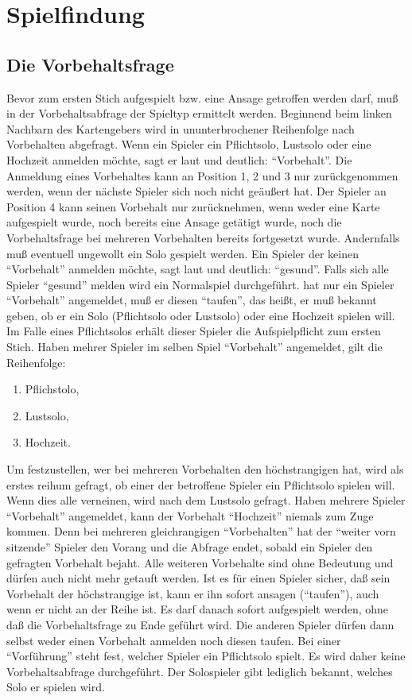 \documentclass[12pt]{scrartcl}
\begin{document}
\section{Spielfindung}

\subsection{Die Vorbehaltsfrage}
Bevor zum ersten Stich aufgespielt bzw. eine Ansage getroffen
werden darf, muß in der Vorbehaltsabfrage der Spieltyp ermittelt
werden. Beginnend beim linken Nachbarn des Kartengebers wird in
ununterbrochener Reihenfolge nach Vorbehalten abgefragt. Wenn ein
Spieler ein Pflichtsolo, Lustsolo oder eine Hochzeit anmelden
möchte, sagt er laut und deutlich: "`Vorbehalt"'. Die Anmeldung
eines Vorbehaltes kann an Position 1, 2 und 3 nur zurückgenommen
werden, wenn der nächste Spieler sich noch nicht geäußert hat.
Der Spieler an Position 4 kann seinen Vorbehalt nur zurücknehmen,
wenn weder eine Karte aufgespielt wurde, noch bereits eine Ansage
getätigt wurde, noch die Vorbehaltsfrage bei mehreren
Vorbehalten bereits fortgesetzt wurde. Andernfalls muß eventuell
ungewollt ein Solo gespielt werden. Ein Spieler der keinen
"`Vorbehalt"' anmelden möchte, sagt laut und deutlich:
"`gesund"'. Falls sich alle Spieler "`gesund"' melden wird ein
Normalspiel durchgeführt. hat nur ein Spieler "`Vorbehalt"'
angemeldet, muß er diesen "`taufen"', das heißt, er muß bekannt
geben, ob er ein Solo (Pflichtsolo oder Lustsolo) oder eine
Hochzeit spielen will. Im Falle eines Pflichtsolos erhält dieser
Spieler die Aufspielpflicht zum ersten Stich. Haben mehrer Spieler
im selben Spiel "`Vorbehalt"' angemeldet, gilt die Reihenfolge:
\begin{enumerate}
  \item Pflichstolo,
  \item Lustsolo,
  \item Hochzeit.
\end{enumerate}
Um festzustellen, wer bei mehreren Vorbehalten den
höchstrangigen hat, wird als erstes reihum gefragt, ob einer der
betroffene Spieler ein Pflichtsolo spielen will. Wenn dies alle
verneinen, wird nach dem Lustsolo gefragt. Haben mehrere Spieler
"`Vorbehalt"' angemeldet, kann der Vorbehalt "`Hochzeit"' niemals
zum Zuge kommen. Denn bei mehreren gleichrangigen "`Vorbehalten"'
hat der "`weiter vorn sitzende"' Spieler den Vorang und die
Abfrage endet, sobald ein Spieler den gefragten Vorbehalt bejaht.
Alle weiteren Vorbehalte sind ohne Bedeutung und dürfen auch
nicht mehr getauft werden. Ist es für einen Spieler sicher, daß
sein Vorbehalt der höchstrangige ist, kann er ihn sofort ansagen
("`taufen"'), auch wenn er nicht an der Reihe ist. Es darf danach
sofort aufgespielt werden, ohne daß die Vorbehaltsfrage zu Ende
geführt wird. Die anderen Spieler dürfen dann selbst weder
einen Vorbehalt anmelden noch diesen taufen. Bei einer
"`Vorführung"' steht fest, welcher Spieler ein Pflichtsolo
spielt. Es wird daher keine Vorbehaltsabfrage durchgeführt. Der
Solospieler gibt lediglich bekannt, welches Solo er spielen wird.
\end{document}
